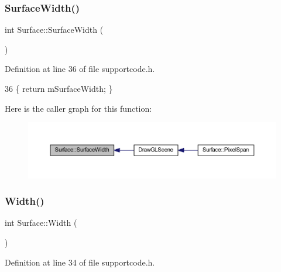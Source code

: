 \subsubsection{\texorpdfstring{Surface\+Width()}{SurfaceWidth()}}
{\footnotesize\ttfamily int Surface\+::\+Surface\+Width (\begin{DoxyParamCaption}{ }\end{DoxyParamCaption})\hspace{0.3cm}{\ttfamily [inline]}}



Definition at line 36 of file supportcode.\+h.


\begin{DoxyCode}
36 \{ \textcolor{keywordflow}{return} mSurfaceWidth;  \}
\end{DoxyCode}
Here is the caller graph for this function\+:
\nopagebreak
\begin{figure}[H]
\begin{center}
\leavevmode
\includegraphics[width=350pt]{class_surface_a4cbf23ea0c8ff533271109fc2a1a863d_icgraph}
\end{center}
\end{figure}
\mbox{\label{class_surface_ae76d7c2fa208df6979a77cc60e8105c0}} 
\subsubsection{\texorpdfstring{Width()}{Width()}}
{\footnotesize\ttfamily int Surface\+::\+Width (\begin{DoxyParamCaption}{ }\end{DoxyParamCaption})\hspace{0.3cm}{\ttfamily [inline]}}



Definition at line 34 of file supportcode.\+h.



